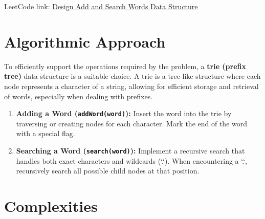 LeetCode link: \href{https://leetcode.com/problems/design-add-and-search-words-data-structure/}{Design Add and Search Words Data Structure}


\section*{Algorithmic Approach}

To efficiently support the operations required by the problem, a \textbf{trie (prefix tree)} data structure is a suitable choice. A trie is a tree-like structure where each node represents a character of a string, allowing for efficient storage and retrieval of words, especially when dealing with prefixes.

\begin{enumerate}
    \item \textbf{Adding a Word (\texttt{addWord(word)}):}  
    Insert the word into the trie by traversing or creating nodes for each character. Mark the end of the word with a special flag.
    
    \item \textbf{Searching a Word (\texttt{search(word)}):}  
    Implement a recursive search that handles both exact characters and wildcards (`.`). When encountering a `.`, recursively search all possible child nodes at that position.
\end{enumerate}


\section*{Complexities}

